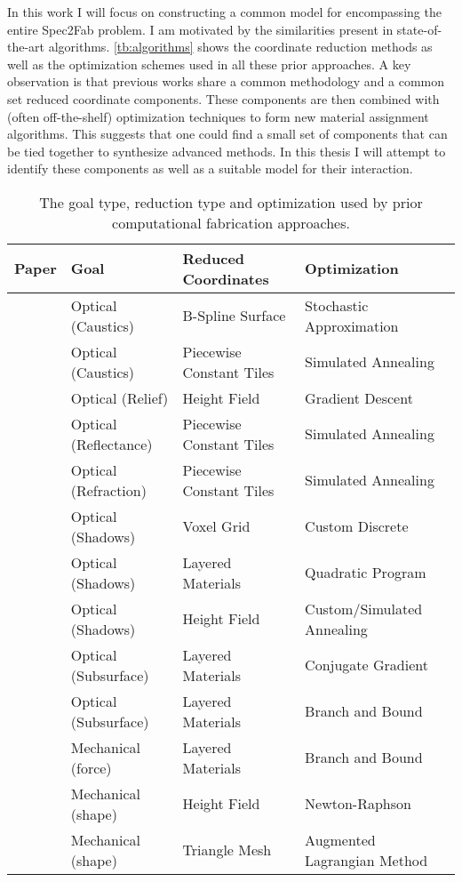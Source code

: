 In this work I will focus on constructing a common model for encompassing the entire Spec2Fab problem. I am motivated by the similarities present in state-of-the-art algorithms.  \autoref{tb:algorithms} shows the coordinate reduction methods as well as the optimization schemes used in all these prior approaches. A key observation is that previous works share a common methodology and  a common set reduced coordinate components. These components are then combined with (often off-the-shelf) optimization techniques to form new material assignment algorithms. This suggests that one could find a small set of components that can be tied together to synthesize  advanced methods. In this thesis I will attempt to identify these components as well as a suitable model for their interaction.


\begin{table*}[htp]
\centering
\begin{tabular}{clll}
\hline
\textbf{Paper} & \textbf{Goal} & \textbf{Reduced Coordinates}  & \textbf{Optimization} \\
\hline
~\cite{Finckh:2010} & Optical (Caustics) & B-Spline Surface & Stochastic Approximation \\
~\cite{Marios:2011} & Optical (Caustics) & Piecewise Constant Tiles & Simulated Annealing \\
~\cite{Alexa:2010:RAI}& Optical (Relief) & Height Field & Gradient Descent\\
~\cite{Weyrich:2009:FMF} &Optical (Reflectance)&Piecewise Constant Tiles& Simulated Annealing\\
~\cite{Papas:2012} & Optical (Refraction) & Piecewise Constant Tiles & Simulated Annealing \\
~\cite{Mitra:2009:SA}&Optical (Shadows)&Voxel Grid&Custom Discrete\\
~\cite{Baran:2012:MLA}&Optical (Shadows)& Layered Materials & Quadratic Program \\
~\cite{Bermano:2012} & Optical (Shadows) & Height Field & Custom/Simulated Annealing \\
~\cite{Dong:2010:FSS}&Optical (Subsurface) &Layered Materials&Conjugate Gradient\\
~\cite{Hasan:2010:PRO}& Optical (Subsurface) & Layered Materials & Branch and Bound\\
~\cite{Bickel:2010:DAF}& Mechanical (force) & Layered Materials  & Branch and Bound \\
~\cite{Bickel:2012} & Mechanical (shape) &  Height Field &  Newton-Raphson \\
~\cite{sko:2012}& Mechanical (shape) & Triangle Mesh & Augmented Lagrangian Method \\
\hline
\end{tabular}
\caption{The goal type, reduction type and optimization used by prior computational fabrication approaches.}
\label{tb:algorithms}
\end{table*}